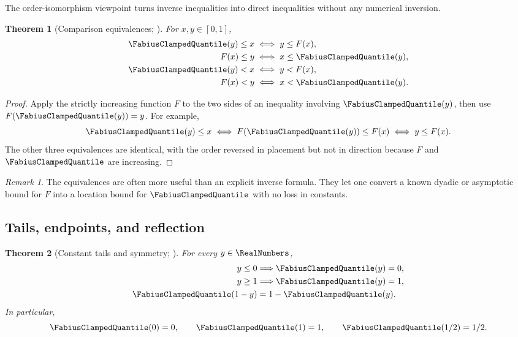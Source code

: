 \documentclass[11pt,oneside]{article}
\newtheorem{theorem}{Theorem}[section]
\theoremstyle{definition}
\theoremstyle{remark}
\newtheorem{remark}[remark]{Remark}
\begin{document}
The order-isomorphism viewpoint turns inverse inequalities into direct
inequalities without any numerical inversion.

\begin{theorem}[Comparison equivalences; \Formalized]
\label{inverse:thm:inverse-comparisons}
For $x,y\in[0,1]$,
\begin{align}
 \FabiusClampedQuantile(y)\leq x&\iff y\leq F(x), \label{inverse:eq:inv-le}\\
 F(x)\leq y&\iff x\leq \FabiusClampedQuantile(y), \label{inverse:eq:F-le}\\
 \FabiusClampedQuantile(y)<x&\iff y<F(x), \label{inverse:eq:inv-lt}\\
 F(x)<y&\iff x<\FabiusClampedQuantile(y). \label{inverse:eq:F-lt}
\end{align}
\end{theorem}

\begin{proof}
Apply the strictly increasing function $F$ to the two sides of an
inequality involving $\FabiusClampedQuantile(y)$, then use $F(\FabiusClampedQuantile(y))=y$.  For example,
\[
 \FabiusClampedQuantile(y)\leq x
 \iff F(\FabiusClampedQuantile(y))\leq F(x)
 \iff y\leq F(x).
\]
The other three equivalences are identical, with the order reversed in
placement but not in direction because $F$ and $\FabiusClampedQuantile$ are increasing.
\end{proof}

\begin{remark}
The equivalences are often more useful than an explicit inverse formula.
They let one convert a known dyadic or asymptotic bound for $F$ into a
location bound for $\FabiusClampedQuantile$ with no loss in constants.
\end{remark}

\subsection{Tails, endpoints, and reflection}

\begin{theorem}[Constant tails and symmetry; \Formalized]
\label{inverse:thm:inverse-symmetry}
For every $y\in\RealNumbers$,
\begin{align}
 y\leq0&\Longrightarrow \FabiusClampedQuantile(y)=0,\\
 y\geq1&\Longrightarrow \FabiusClampedQuantile(y)=1,\\
 \FabiusClampedQuantile(1-y)&=1-\FabiusClampedQuantile(y). \label{inverse:eq:inv-reflection}
\end{align}
In particular,
\[
 \FabiusClampedQuantile(0)=0,\qquad \FabiusClampedQuantile(1)=1,\qquad \FabiusClampedQuantile(1/2)=1/2.
\]
\end{theorem}
\end{document}
